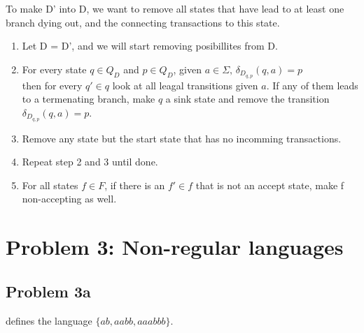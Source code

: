\documentclass{article}
\begin{document}
To make D' into D, we want to remove all states that have lead to at least one branch dying out, and the connecting transactions to this state.

\begin{enumerate}
\item Let D = D', and we will start removing posibillites from D.
\item For every state $q \in Q_D$ and $p \in Q_D$, given $a \in \Sigma, \, \delta_{D_{q,p}}(q, a) = p$  \\
  then for every $q' \in q$ look at all leagal transitions given $a$. If any of them leads to a termenating branch, make $q$ a sink state  and remove the transition $\delta_{D_{q,p}}(q, a) = p$.
\item Remove any state but the start state that has no incomming transactions.
\item Repeat step 2 and 3 until done.
\item For all states $f \in F$, if there is an $f' \in f$ that is not an accept state, make f non-accepting as well.  
\end{enumerate}






\section{Problem 3: Non-regular languages}
\subsection{Problem 3a}

\begin{center}
\end{center}
defines the language $\{ab,aabb, aaabbb\}$.
\end{document}

